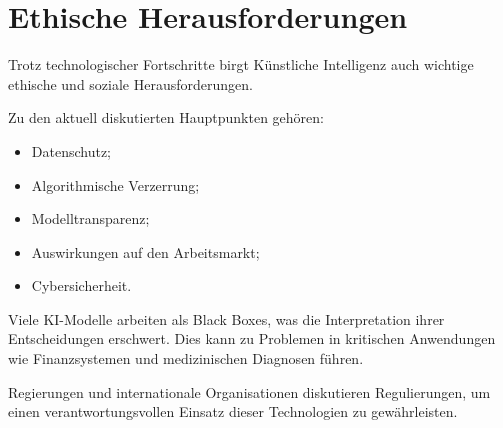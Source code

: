\section{Ethische Herausforderungen}

Trotz technologischer Fortschritte birgt Künstliche Intelligenz auch wichtige ethische und
soziale Herausforderungen.

Zu den aktuell diskutierten Hauptpunkten gehören:

\begin{itemize}
    \item Datenschutz;
    \item Algorithmische Verzerrung;
    \item Modelltransparenz;
    \item Auswirkungen auf den Arbeitsmarkt;
    \item Cybersicherheit.
\end{itemize}

Viele KI-Modelle arbeiten als Black Boxes, was die Interpretation ihrer Entscheidungen erschwert.
Dies kann zu Problemen in kritischen Anwendungen wie Finanzsystemen und medizinischen
Diagnosen führen.

Regierungen und internationale Organisationen diskutieren Regulierungen, um einen verantwortungsvollen
Einsatz dieser Technologien zu gewährleisten. 
